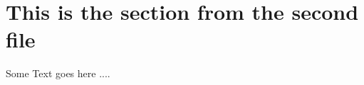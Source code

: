 \documentclass[Working_with_verbatim.tex]{subfiles} %
\begin{document}
\section{This is the section from the second file}
Some Text goes here ....
\end{document}
